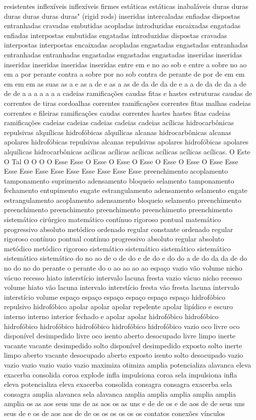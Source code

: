 resistentes inflexíveis inflexíveis firmes estáticas estáticas inabaláveis duras duras duras duras duras duras" (rigid rods) inseridas intercaladas enfiadas dispostas entranhadas cravadas embutidas acopladas introduzidas encaixadas engatadas enfiadas interpostas embutidas engatadas introduzidas dispostas cravadas interpostas interpostas encaixadas acopladas engastadas engastadas entranhadas entranhadas entranhadas engastadas engastadas engastadas inseridas inseridas inseridas inseridas inseridas inseridas entre em e no ao sob e entre a sobre no ao em a por perante contra a sobre por no sob contra de perante de por de em em em em em as suas as a e as a de e as a as de da de da de e a a de da de da a de de de a a a a a a a cadeias ramificações caudas fitas e hastes estruturas caudas de correntes de tiras cordoalhas correntes ramificações correntes fitas malhas cadeias correntes e fileiras ramificações caudas correntes hastes hastes fitas cadeias ramificações cadeias cadeias cadeias cadeias cadeias acílicas hidrocarbônicas repulsivas alquílicas hidrofóbicas alquílicas alcanas hidrocarbônicas alcanas apolares hidrofóbicas repulsivas alcanas repulsivas apolares hidrofóbicas apolares alquílicas hidrocarbônicas acílicas acílicas acílicas acílicas acílicas acílicas. O Este O Tal O O O O Esse Esse O Esse O Esse O Esse O Esse O Esse O Esse Esse Esse Esse Esse Esse Esse Esse Esse Esse Esse preenchimento acoplamento tamponamento suprimento adensamento bloqueio selamento tamponamento fechamento entupimento engate estrangulamento adensamento selamento engate estrangulamento acoplamento adensamento bloqueio selamento preenchimento preenchimento preenchimento preenchimento preenchimento preenchimento sistemático cirúrgico matemático contínuo rigoroso pontual matemático progressivo absoluto metódico ordenado regular constante ordenado regular rigoroso contínuo pontual contínuo progressivo absoluto regular absoluto metódico metódico rigoroso sistemático sistemático sistemático sistemático sistemático sistemático do no ao de o de do e de do e do do a de do da da de do no do no do perante o perante do o ao ao ao ao espaço vazio vão volume nicho vácuo recesso hiato interstício intervalo lacuna fresta vazio vácuo nicho recesso volume hiato vão lacuna intervalo interstício fresta vão fresta lacuna intervalo interstício volume espaço espaço espaço espaço espaço espaço hidrofóbico repulsivo hidrofóbico apolar apolar apolar repelente apolar lipídico e escuro interno interno interior fechado e apolar apolar hidrofóbico hidrofóbico hidrofóbico hidrofóbico hidrofóbico hidrofóbico hidrofóbico vazio oco livre oco disponível desimpedido livre oco isento aberto desocupado livre limpo inerte vacante vacante desimpedido solto disponível desimpedido exposto solto inerte limpo aberto vacante desocupado aberto exposto isento solto desocupado vazio vazio vazio vazio vazio vazio maximiza otimiza amplia potencializa alavanca eleva exacerba consolida coroa explode infla impulsiona coroa sela impulsiona infla eleva potencializa eleva exacerba consolida consagra consagra exacerba sela consagra amplia alavanca sela alavanca amplia amplia amplia amplia amplia amplia os as aos seus uns de as aos os as uns e de de os e de aos de de seus uns seus de e os de aos aos de de os os os os os os contatos conexões vínculos 